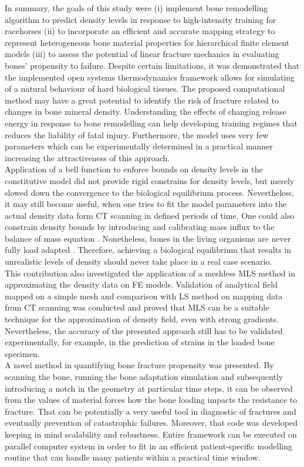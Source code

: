 \documentclass[11pt]{acmeArticle}
\numberwithin{equation}{section}
\begin{document}
In summary, the goals of this study were (i) implement bone remodelling algorithm to predict density levels in response to high-intensity training for racehorses (ii) to incorporate an efficient and accurate mapping strategy to represent heterogeneous bone material properties for hierarchical finite element models (iii) to assess the potential of linear fracture mechanics in evaluating bones' propensity to failure. Despite certain limitations, it was demonstrated that the implemented open systems thermodynamics framework allows for simulating of a natural behaviour of hard biological tissues. The proposed computational method may have a great potential to identify the risk of fracture related to changes in bone mineral density. Understanding the effects of changing release energy in response to bone remodelling can help developing training regimes that reduces the liability of fatal injury. Furthermore, the model uses very few parameters which can be experimentally determined in a practical manner increasing the attractiveness of this approach.\\ 
Application of a bell function to enforce bounds on density levels in the constitutive model did not provide rigid constrains for density levels, but merely slowed down the convergence to the biological equilibrium process. Nevertheless, it may still become useful, when one tries to fit the model parameters into the actual density data form CT scanning in defined periods of time. One could also constrain density bounds by introducing and calibrating mass influx to the balance of mass equation \citep{sharma2013adaptive}. Nonetheless, bones in the living organisms are never fully load adapted \citep{christen2014bone}. Therefore, achieving a biological equilibrium that results in unrealistic levels of density should never take place in a real case scenario. \\
This contribution also investigated the application of a meshless MLS method in approximating the density data on FE models. Validation of analytical field mapped on a simple mesh and comparison with LS method on mapping data from CT scanning was conducted and proved that MLS can be a suitable technique for the approximation of density field, even with strong gradients. Nevertheless, the accuracy of the presented approach still has to be validated experimentally, for example, in the prediction of strains in the loaded bone specimen.  \\
A novel method in quantifying bone fracture propensity was presented. By scanning the bone, running the bone adaptation simulation and subsequently introducing a notch in the geometry at particular time steps, it can be observed from the values of material forces how the bone loading impacts the resistance to fracture. That can be potentially a very useful tool in diagnostic of fractures and eventually prevention of catastrophic failures. Moreover, that code was developed keeping in mind scalability and robustness. Entire framework can be executed on parallel computer system in order to fit in an efficient patient-specific modelling routine that can handle many patients within a practical time window. \\
\end{document}
